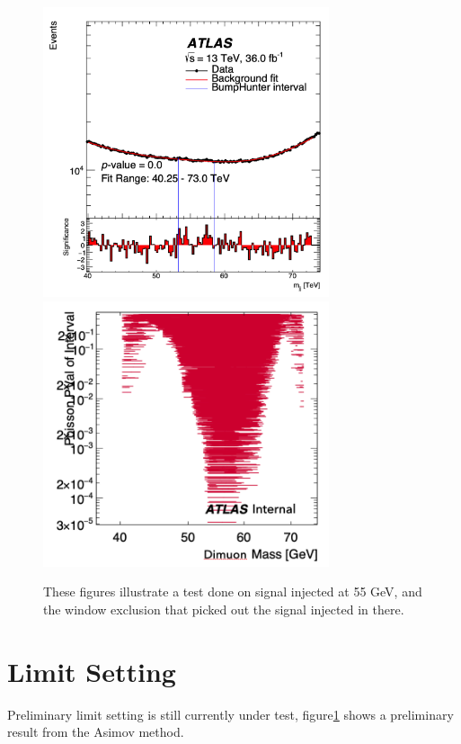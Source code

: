 \begin{figure}[!htb]
    \begin{center}
        \includegraphics[width=0.75\textwidth]{figures/chapter_dimuon/signalinjected}
        \includegraphics[width=0.75\textwidth]{figures/chapter_dimuon/signalinjected2}
        \caption{
        These figures illustrate a test done on signal injected at 55 GeV, and the window exclusion that picked out the signal injected in there.}
    \end{center}
\end{figure}

\section{Limit Setting}
Preliminary limit setting is still currently under test, figure\ref{} shows a preliminary result from the Asimov method. 


